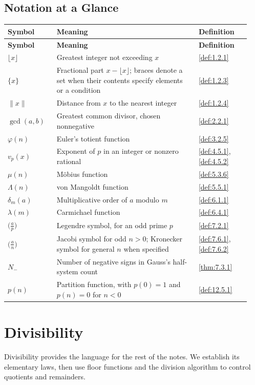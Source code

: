 \documentclass[11pt]{article}
\theoremstyle{ntstyle}
\newcommand{\legs}[2]{\bigl(\tfrac{#1}{#2}\bigr)}
\begin{document}
\subsection*{Notation at a Glance}
\begin{longtable}{@{}p{0.19\linewidth}p{0.55\linewidth}p{0.20\linewidth}@{}}
\textbf{Symbol} & \textbf{Meaning} & \textbf{Definition} \\
\hline
\endfirsthead
\textbf{Symbol} & \textbf{Meaning} & \textbf{Definition} \\
\hline
\endhead
$\lfloor x\rfloor$ & Greatest integer not exceeding $x$ & \ref{def:1.2.1} \\
$\{x\}$ & Fractional part $x-\lfloor x\rfloor$; braces denote a set when their contents specify elements or a condition & \ref{def:1.2.3} \\
$\lVert x\rVert$ & Distance from $x$ to the nearest integer & \ref{def:1.2.4} \\
$\gcd(a,b)$ & Greatest common divisor, chosen nonnegative & \ref{def:2.2.1} \\
$\varphi(n)$ & Euler's totient function & \ref{def:3.2.5} \\
$v_p(x)$ & Exponent of $p$ in an integer or nonzero rational & \ref{def:4.5.1}, \ref{def:4.5.2} \\
$\mu(n)$ & Möbius function & \ref{def:5.3.6} \\
$\Lambda(n)$ & von Mangoldt function & \ref{def:5.5.1} \\
$\delta_m(a)$ & Multiplicative order of $a$ modulo $m$ & \ref{def:6.1.1} \\
$\lambda(m)$ & Carmichael function & \ref{def:6.4.1} \\
$\legs{a}{p}$ & Legendre symbol, for an odd prime $p$ & \ref{def:7.2.1} \\
$\legs{a}{n}$ & Jacobi symbol for odd $n>0$; Kronecker symbol for general $n$ when specified & \ref{def:7.6.1}, \ref{def:7.6.2} \\
$N_{-}$ & Number of negative signs in Gauss's half-system count & \ref{thm:7.3.1} \\
$p(n)$ & Partition function, with $p(0)=1$ and $p(n)=0$ for $n<0$ & \ref{def:12.5.1} \\
\end{longtable}

\section{Divisibility}

Divisibility provides the language for the rest of the notes. We establish its elementary laws, then use floor
functions and the division algorithm to control quotients and remainders.
\end{document}
